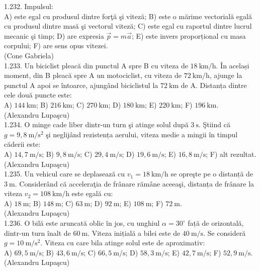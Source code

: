 1.232. Impulsul:\\ A) este egal cu produsul dintre forţă şi viteză; B) este o mărime vectorială egală cu produsul dintre masă şi vectorul viteză; C) este egal cu raportul dintre lucrul mecanic şi timp; D) are expresia $\vec{p}=m \vec{a}$; E) este invers proporțional cu masa corpului; F) are sens opus vitezei.\\ (Cone Gabriela)\\

1.233. Un biciclist pleacă din punctul A spre B cu viteza de $18 \mathrm{~km} / \mathrm{h}$. În același moment, din B pleacă spre A un motociclist, cu viteza de $72 \mathrm{~km} / \mathrm{h}$, ajunge la punctul A apoi se întoarce, ajungând biciclistul la $72 \mathrm{~km}$ de A. Distanța dintre cele două puncte este:\\ A) $144 \mathrm{~km}$; B) $216 \mathrm{~km}$; C) $270 \mathrm{~km}$; D) $180 \mathrm{~km}$; E) $220 \mathrm{~km}$; F) $196 \mathrm{~km}$.\\ (Alexandru Lupaşcu)\\

1.234. O minge cade liber dintr-un turn şi atinge solul după $3 \mathrm{~s}$. Ştiind că $g=9,8 \mathrm{~m} / \mathrm{s}^{2}$ şi neglijând rezistența aerului, viteza medie a mingii în timpul căderii este:\\ A) $14,7 \mathrm{~m} / \mathrm{s}$; B) $9,8 \mathrm{~m} / \mathrm{s}$; C) $29,4 \mathrm{~m} / \mathrm{s}$; D) $19,6 \mathrm{~m} / \mathrm{s}$; E) $16,8 \mathrm{~m} / \mathrm{s}$; F) alt rezultat.\\ (Alexandru Lupaşcu)\\

1.235. Un vehicul care se deplasează cu $v_{1}=18 \mathrm{~km} / \mathrm{h}$ se opreşte pe o distanță de $3 \mathrm{~m}$. Considerând că acceleraţia de frânare rămâne aceeaşi, distanța de frânare la viteza $v_{2}=108 \mathrm{~km} / \mathrm{h}$ este egală cu:\\ A) $18 \mathrm{~m}$; B) $148 \mathrm{~m}$; C) $63 \mathrm{~m}$; D) $92 \mathrm{~m}$; E) $108 \mathrm{~m}$; F) $72 \mathrm{~m}$.\\ (Alexandru Lupaşcu)\\

1.236. O bilă este aruncată oblic în jos, cu unghiul $\alpha=30^{\circ}$ față de orizontală, dintr-un turn înalt de $60 \mathrm{~m}$. Viteza inițială a bilei este de $40 \mathrm{~m} / \mathrm{s}$. Se consideră $g=10 \mathrm{~m} / \mathrm{s}^{2}$. Viteza cu care bila atinge solul este de aproximativ:\\ A) $69,5 \mathrm{~m} / \mathrm{s}$; B) $43,6 \mathrm{~m} / \mathrm{s}$; C) $66,5 \mathrm{~m} / \mathrm{s}$; D) $58,3 \mathrm{~m} / \mathrm{s}$; E) $42,7 \mathrm{~m} / \mathrm{s}$; F) $52,9 \mathrm{~m} / \mathrm{s}$.\\ (Alexandru Lupaşcu)\\

